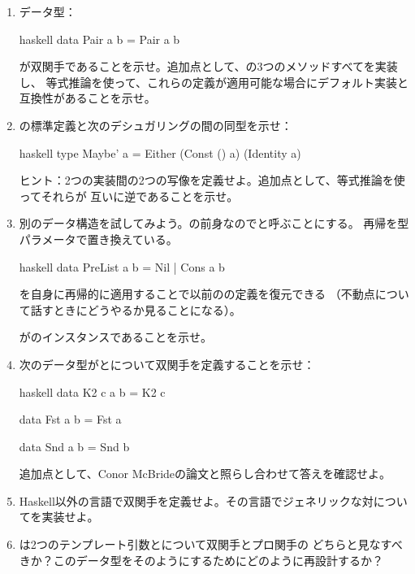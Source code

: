 \begin{enumerate}
  \tightlist
  \item
        データ型：

        \begin{snip}{haskell}
data Pair a b = Pair a b
\end{snip}

        が双関手であることを示せ。追加点として、の3つのメソッドすべてを実装し、
        等式推論を使って、これらの定義が適用可能な場合にデフォルト実装と互換性があることを示せ。
  \item
        の標準定義と次のデシュガリングの間の同型を示せ：

        \begin{snip}{haskell}
type Maybe' a = Either (Const () a) (Identity a)
\end{snip}

        ヒント：2つの実装間の2つの写像を定義せよ。追加点として、等式推論を使ってそれらが
        互いに逆であることを示せ。
  \item
        別のデータ構造を試してみよう。の前身なのでと呼ぶことにする。
        再帰を型パラメータで置き換えている。

        \begin{snip}{haskell}
data PreList a b = Nil | Cons a b
\end{snip}

        を自身に再帰的に適用することで以前のの定義を復元できる
        （不動点について話すときにどうやるか見ることになる）。

        がのインスタンスであることを示せ。
  \item
        次のデータ型がとについて双関手を定義することを示せ：

        \begin{snip}{haskell}
data K2 c a b = K2 c

data Fst a b = Fst a

data Snd a b = Snd b
\end{snip}

        追加点として、Conor McBrideの論文と照らし合わせて答えを確認せよ。
  \item
        Haskell以外の言語で双関手を定義せよ。その言語でジェネリックな対についてを実装せよ。
  \item
        は2つのテンプレート引数とについて双関手とプロ関手の
        どちらと見なすべきか？このデータ型をそのようにするためにどのように再設計するか？
\end{enumerate}
